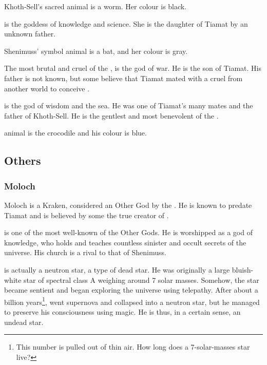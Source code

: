 Khoth-Sell's sacred animal is a worm. Her colour is black. 

 is the \draconic{} goddess of knowledge and science. She is the daughter of Tiamat by an unknown father. 

Shenimuss' symbol animal is a bat, and her colour is gray. 

\subsubsectionn{\Typhon{}}
The most brutal and cruel of the \Dominators{},  is the god of war. He is the son of Tiamat. His father is not known, but some believe that Tiamat mated with a cruel \Daemon{} from another world to conceive \Typhon{}. 

\subsubsectionn{\Iurzmacul{}}
\Iurzmacul{} is the \draconic{} god of wisdom and the sea. He was one of Tiamat's many mates and the father of Khoth-Sell. He is the gentlest and most benevolent of the \Dominators{}. 

\Iurzmaculz{} animal is the crocodile and his colour is blue. 



\subsection{Others}
\subsubsection{Moloch}
Moloch is a Kraken, considered an Other God by the \dragons{}. He is known to predate Tiamat and is believed by some the true creator of \Dragonkind. 

\subsubsectionn{\NerrhanKoss{}}
\label{Nerrhan-Koss}
 is one of the most well-known of the Other Gods. He is worshipped as a god of knowledge, who holds and teaches countless sinister and occult secrets of the universe. His church is a rival to that of Shenimuss. 

\NerrhanKoss{} is actually a neutron star, a type of dead star. He was originally a large bluish-white star of spectral class A weighing around 7 solar masses. Somehow, the star became sentient and began exploring the universe using telepathy. After about a billion years\footnote{This number is pulled out of thin air. How long does a 7-solar-masses star live?}, \NerrhanKoss{} went supernova and collapsed into a neutron star, but he managed to preserve his consciousness using magic. He is thus, in a certain sense, an undead star. 

